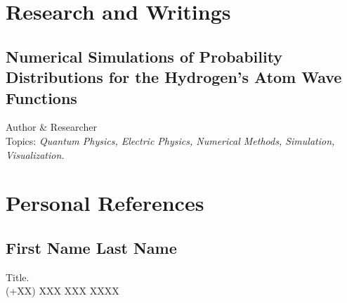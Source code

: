 \separator

\section{Research and Writings}
\reducespace
\begin{multicols}{2}\raggedcolumns%
	\parbox{0.48\textwidth}{
		\subsection{Numerical Simulations of Probability Distributions for the Hydrogen’s Atom Wave Functions}
		Author \& Researcher \hfill {}\\[4pt]
		Topics: \textit{Quantum Physics, 
		Electric Physics, Numerical Methods,
		Simulation, Visualization.}
	}
\end{multicols}

\separator

\section{Personal References}
\begin{multicols}{2}\raggedcolumns%
	\subsection{First Name Last Name}
	Title. \\
	(+XX) XXX XXX XXXX
\end{multicols}

\vspace*{12pt}







